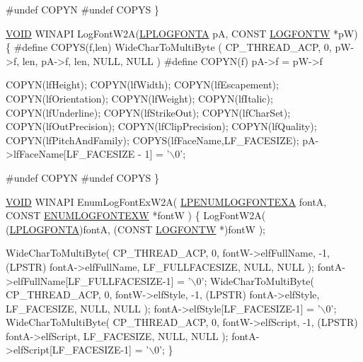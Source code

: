 \begin{DoxyCodeInclude}
\textcolor{preprocessor}{#undef COPYN}
\textcolor{preprocessor}{#undef COPYS}
\}

\hyperlink{interfacevoid}{VOID}
WINAPI
LogFontW2A(\hyperlink{structtag_l_o_g_f_o_n_t_a}{LPLOGFONTA} pA, CONST \hyperlink{struct_l_o_g_f_o_n_t_w}{LOGFONTW} *pW)
\{
\textcolor{preprocessor}{#define COPYS(f,len) WideCharToMultiByte ( CP\_THREAD\_ACP, 0, pW->f, len, pA->f, len, NULL, NULL )}
\textcolor{preprocessor}{#define COPYN(f) pA->f = pW->f}

    COPYN(lfHeight);
    COPYN(lfWidth);
    COPYN(lfEscapement);
    COPYN(lfOrientation);
    COPYN(lfWeight);
    COPYN(lfItalic);
    COPYN(lfUnderline);
    COPYN(lfStrikeOut);
    COPYN(lfCharSet);
    COPYN(lfOutPrecision);
    COPYN(lfClipPrecision);
    COPYN(lfQuality);
    COPYN(lfPitchAndFamily);
    COPYS(lfFaceName,LF\_FACESIZE);
    pA->lfFaceName[LF\_FACESIZE - 1] = \textcolor{charliteral}{'\(\backslash\)0'};

\textcolor{preprocessor}{#undef COPYN}
\textcolor{preprocessor}{#undef COPYS}
\}

\hyperlink{interfacevoid}{VOID}
WINAPI
EnumLogFontExW2A( \hyperlink{structtag_e_n_u_m_l_o_g_f_o_n_t_e_x_a}{LPENUMLOGFONTEXA} fontA, CONST \hyperlink{structtag_e_n_u_m_l_o_g_f_o_n_t_e_x_w}{ENUMLOGFONTEXW} *fontW )
\{
    LogFontW2A( (\hyperlink{structtag_l_o_g_f_o_n_t_a}{LPLOGFONTA})fontA, (CONST \hyperlink{struct_l_o_g_f_o_n_t_w}{LOGFONTW} *)fontW );

    WideCharToMultiByte( CP\_THREAD\_ACP, 0, fontW->elfFullName, -1,
                         (LPSTR) fontA->elfFullName, LF\_FULLFACESIZE, NULL, NULL );
    fontA->elfFullName[LF\_FULLFACESIZE-1] = \textcolor{charliteral}{'\(\backslash\)0'};
    WideCharToMultiByte( CP\_THREAD\_ACP, 0, fontW->elfStyle, -1,
                         (LPSTR) fontA->elfStyle, LF\_FACESIZE, NULL, NULL );
    fontA->elfStyle[LF\_FACESIZE-1] = \textcolor{charliteral}{'\(\backslash\)0'};
    WideCharToMultiByte( CP\_THREAD\_ACP, 0, fontW->elfScript, -1,
                         (LPSTR) fontA->elfScript, LF\_FACESIZE, NULL, NULL );
    fontA->elfScript[LF\_FACESIZE-1] = \textcolor{charliteral}{'\(\backslash\)0'};
\}

\end{DoxyCodeInclude}
 